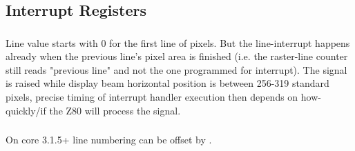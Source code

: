 \pagebreak
\subsection{Interrupt Registers}
\label{zx_next_interrupts_registers}

\subsubsection{}

\begin{NextPort}
\end{NextPort}

Line value starts with 0 for the first line of pixels. But the line-interrupt happens already when the previous line's pixel area is finished (i.e. the raster-line counter still reads "previous line" and not the one programmed for interrupt). The  signal is raised while display beam horizontal position is between 256-319 standard pixels, precise timing of interrupt handler execution then depends on how-quickly/if the Z80 will process the  signal.


\subsubsection{}

\begin{NextPort}
\end{NextPort}

On core 3.1.5+ line numbering can be offset by .


\subsubsection{}

\begin{NextPort}
\end{NextPort}

